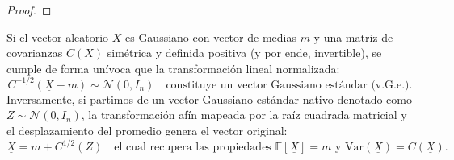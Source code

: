 \begin{definicion}
\begin{proof}
\end{proof}
\end{definicion}


\begin{lema}
    Si el vector aleatorio $\underline{X}$ es Gaussiano con vector de medias $m$ y una matriz de covarianzas $C(\underline{X})$ simétrica y definida positiva (y por ende, invertible), se cumple de forma unívoca que la transformación lineal normalizada:
    \[
    C^{-1/2}(\underline{X}-m) \sim \mathcal{N}(0, I_n) \quad \text{constituye un vector Gaussiano estándar (v.G.e.).}
    \]
    Inversamente, si partimos de un vector Gaussiano estándar nativo denotado como $Z \sim \mathcal{N}(0, I_n)$, la transformación afín mapeada por la raíz cuadrada matricial y el desplazamiento del promedio genera el vector original:
    \[
    \underline{X} = m + C^{1/2}(Z) \quad \text{el cual recupera las propiedades } \mathbb{E}[\underline{X}] = m \text{ y } \text{Var}(\underline{X}) = C(\underline{X}).
    \]
\end{lema}

